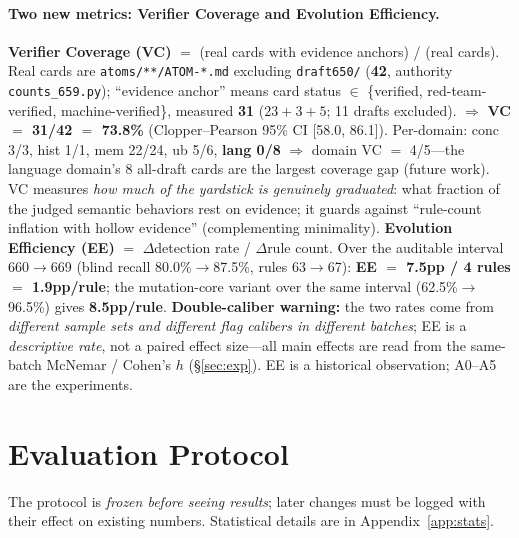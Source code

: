 \documentclass{article}
\begin{document}
\paragraph{Two new metrics: Verifier Coverage and Evolution Efficiency.}
\textbf{Verifier Coverage (VC)} $=$ (real cards with evidence anchors) / (real cards). Real cards
are \texttt{atoms/**/ATOM-*.md} excluding \texttt{draft650/} (\textbf{42}, authority
\texttt{counts\_659.py}); ``evidence anchor'' means card status $\in$ \{verified,
red-team-verified, machine-verified\}, measured \textbf{31} ($23+3+5$; 11 drafts excluded).
$\Rightarrow$ \textbf{VC $=$ 31/42 $=$ 73.8\%} (Clopper--Pearson 95\% CI [58.0, 86.1]).
Per-domain: conc 3/3, hist 1/1, mem 22/24, ub 5/6, \textbf{lang 0/8} $\Rightarrow$ domain VC
$=$ 4/5---the language domain's 8 all-draft cards are the largest coverage gap (future work).
VC measures \emph{how much of the yardstick is genuinely graduated}: what fraction of the judged
semantic behaviors rest on evidence; it guards against ``rule-count inflation with hollow
evidence'' (complementing minimality).
\textbf{Evolution Efficiency (EE)} $=$ $\Delta$detection rate / $\Delta$rule count. Over the
auditable interval 660$\to$669 (blind recall 80.0\%$\to$87.5\%, rules 63$\to$67):
\textbf{EE $=$ 7.5pp / 4 rules $=$ 1.9pp/rule}; the mutation-core variant over the same interval
(62.5\%$\to$96.5\%) gives \textbf{8.5pp/rule}. \textbf{Double-caliber warning:} the two rates come
from \emph{different sample sets and different flag calibers in different batches}; EE is a
\emph{descriptive rate}, not a paired effect size---all main effects are read from the same-batch
McNemar / Cohen's $h$ (\S\ref{sec:exp}). EE is a historical observation; A0--A5 are the
experiments.

\section{Evaluation Protocol}
\label{sec:protocol}
The protocol is \emph{frozen before seeing results}; later changes must be logged with their effect
on existing numbers. Statistical details are in Appendix~\ref{app:stats}.
\end{document}
